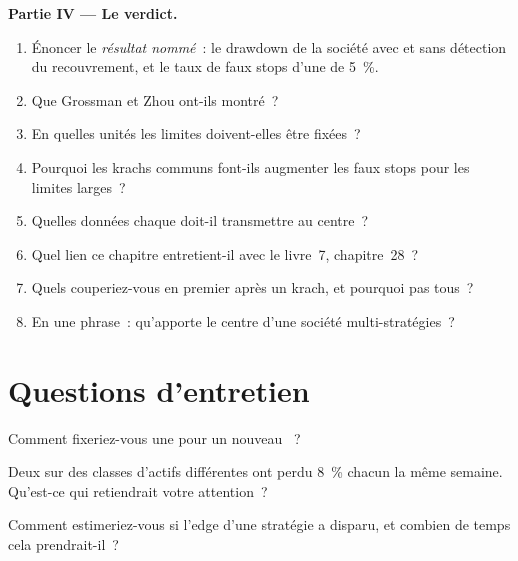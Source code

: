 \begin{problem}
\medskip\noindent\textbf{Partie IV --- Le verdict.}
\begin{enumerate}[resume]
\item Énoncer le \emph{résultat nommé}~: le drawdown de la société avec et sans détection du recouvrement, et le taux de faux stops d'une  de 5~\%.
\item Que Grossman et Zhou ont-ils montré~?
\item En quelles unités les limites doivent-elles être fixées~?
\item Pourquoi les krachs communs font-ils augmenter les faux stops pour les limites larges~?
\item Quelles données chaque  doit-il transmettre au centre~?
\item Quel lien ce chapitre entretient-il avec le livre~7, chapitre~28~?
\item Quels  couperiez-vous en premier après un krach, et pourquoi pas tous~?
\item En une phrase~: qu'apporte le centre d'une société multi-stratégies~?
\end{enumerate}
\end{problem}

\section{Questions d'entretien}

\begin{interviewq}\label{iq:s1:running-a-multi-strategy-book:1}
Comment fixeriez-vous une  pour un nouveau ~?
\end{interviewq}

\begin{interviewq}\label{iq:s1:running-a-multi-strategy-book:2}
Deux  sur des classes d'actifs différentes ont perdu 8~\% chacun la même semaine. Qu'est-ce qui retiendrait votre attention~?
\end{interviewq}

\begin{interviewq}\label{iq:s1:running-a-multi-strategy-book:3}
Comment estimeriez-vous si l'edge d'une stratégie a disparu, et combien de temps cela prendrait-il~?
\end{interviewq}

